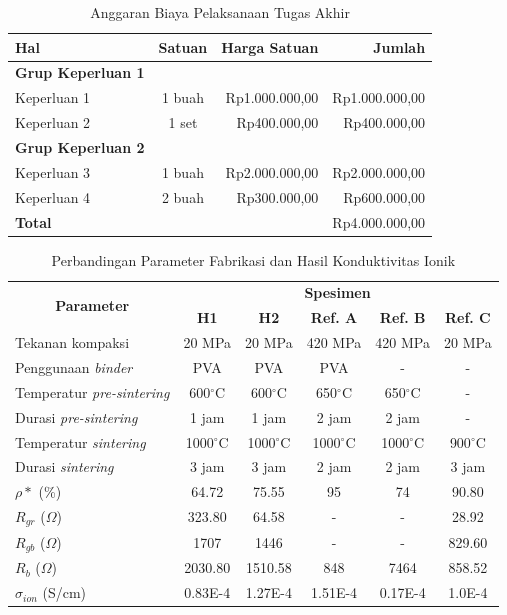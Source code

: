 \begin{table}[htbp]
	\small
	\centering
	\caption{Anggaran Biaya Pelaksanaan Tugas Akhir}
	\label{table:contoh_anggaran}
	\begin{tabular}{lcrr}
		\toprule
		\multicolumn{1}{l}{\textbf{Hal}} & \multicolumn{1}{l}{\textbf{Satuan}} & \multicolumn{1}{l}{\textbf{Harga Satuan}} & \multicolumn{1}{r}{\textbf{Jumlah}}\\
		\midrule
		\textbf{Grup Keperluan 1} \\
		Keperluan 1 & 1 buah & Rp1.000.000,00 & Rp1.000.000,00 \\
		Keperluan 2 & 1 set & Rp400.000,00 & Rp400.000,00 \\
		\midrule
		\textbf{Grup Keperluan 2} \\
		Keperluan 3 & 1 buah & Rp2.000.000,00 & Rp2.000.000,00 \\
		Keperluan 4 & 2 buah & Rp300.000,00 & Rp600.000,00 \\
		\midrule
		\textbf{Total} & & & Rp4.000.000,00 \\
		\bottomrule
	\end{tabular}
\end{table}

\begin{table}[htbp]
    \small
    \centering
    \caption{Perbandingan Parameter Fabrikasi dan Hasil Konduktivitas Ionik}
    \label{table:anal_kondi}
    \begin{tabular}{lccccc}
    \toprule
    \multicolumn{1}{c}{\multirow{2}{*}{\textbf{Parameter}}} & \multicolumn{5}{c}{\textbf{Spesimen}}\\
    \cmidrule{2-6}
    & \textbf{H1} & \textbf{H2} & \textbf{Ref. A}\cite{wei_fabrication_2017} & \textbf{Ref. B}\cite{wei_fabrication_2017} & \textbf{Ref. C}\cite{wei_fabrication_2017}\\
    \midrule
    Tekanan kompaksi & 20 MPa & 20 MPa & 420 MPa & 420 MPa & 20 MPa\\
    Penggunaan \textit{binder} & PVA & PVA & PVA & - & -\\
    Temperatur \textit{pre-sintering} & 600$^\circ$C & 600$^\circ$C & 650$^\circ$C & 650$^\circ$C & -\\
    Durasi \textit{pre-sintering} & 1 jam & 1 jam & 2 jam & 2 jam & -\\
    Temperatur \textit{sintering} & 1000$^\circ$C & 1000$^\circ$C & 1000$^\circ$C & 1000$^\circ$C & 900$^\circ$C\\
    Durasi \textit{sintering} & 3 jam & 3 jam & 2 jam & 2 jam & 3 jam\\
    $\rho *$ (\%) & 64.72 & 75.55 & 95 & 74 & 90.80\\
    $R_{gr}$ ($\Omega$) & 323.80 & 64.58 & - & - & 28.92\\
    $R_{gb}$ ($\Omega$) & 1707 & 1446 & - & - & 829.60\\
    $R_b$ ($\Omega$) & 2030.80 & 1510.58 & 848 & 7464 & 858.52\\
    $\sigma_{ion}$ (S/cm) & 0.83E-4 & 1.27E-4 & 1.51E-4 & 0.17E-4 & 1.0E-4\\
    \bottomrule
    \end{tabular}
\end{table}

